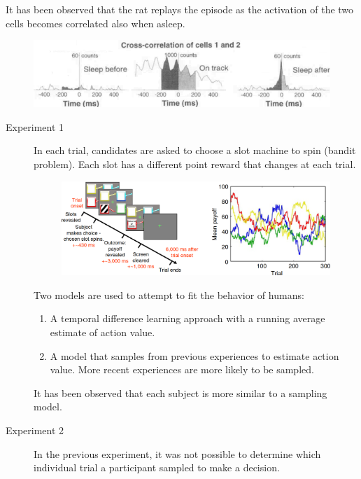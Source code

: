 \begin{description}
\begin{casestudy}
            It has been observed that the rat replays the episode as the activation of the two cells becomes correlated also when asleep.
            \begin{figure}[H]
                \centering
                \includegraphics[width=0.6\linewidth]{./img/hippocampus_replay3.png}
            \end{figure}
        \end{casestudy}

        \begin{casestudy}
            \phantom{}
            \begin{description}
                \item[Experiment 1] 
                    In each trial, candidates are asked to choose a slot machine to spin (bandit problem). Each slot has a different point reward that changes at each trial.
                    \begin{figure}[H]
                        \centering
                        \includegraphics[width=0.55\linewidth]{./img/memory_decision1.png}
                    \end{figure}
        
                    Two models are used to attempt to fit the behavior of humans:
                    \begin{enumerate}
                        \item A temporal difference learning approach with a running average estimate of action value.
                        \item A model that samples from previous experiences to estimate action value. More recent experiences are more likely to be sampled.
                    \end{enumerate}
                    It has been observed that each subject is more similar to a sampling model.

                \item[Experiment 2]
                    In the previous experiment, it was not possible to determine which individual trial a participant sampled to make a decision.


\end{description}
\end{casestudy}
\end{description}
